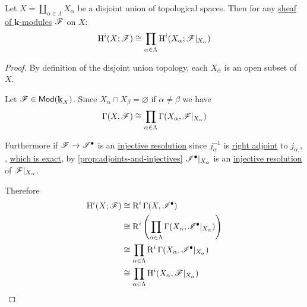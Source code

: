 \documentclass[../../main]{subfiles}
\begin{document}
\begin{theorem}[Additivity]\label{thm:additivity-axiom}
  Let \(X = \coprod_{\alpha \in \Lambda} X_{\alpha}\) be a disjoint union of topological spaces.
  Then for any \hyperref[def:sheaf]{sheaf of \(\mathbf{k}\)-modules} \(\mathscr{F}\) on \(X\):
  \begin{equation*}
    \operatorname{H}^{i}(X; \mathscr{F}) \cong \prod_{\alpha \in \Lambda} \operatorname{H}^{i}(X_{\alpha}; \mathscr{F}|_{X_{\alpha}})
  \end{equation*}
\end{theorem}
\begin{proof}
  By definition of the disjoint union topology, each \(X_{\alpha}\) is an open subset of \(X\).

  Let \(\mathscr{F} \in \mathsf{Mod} ( \underline{\mathbf{k}}_{X} )\).
  Since \(X_{\alpha} \cap X_{\beta} = \varnothing\) if \(\alpha \neq \beta\) we have
  \begin{equation*}
    \Gamma(X, \mathscr{F}) \cong \prod_{\alpha \in \Lambda} \Gamma(X_{\alpha}, \mathscr{F}|_{X_{\alpha}})
  \end{equation*}

  Furthermore if \(\mathscr{F} \to \mathscr{I}^{\bullet}\) is an \hyperref[def:resolution]{injective resolution} since \(j_{\alpha}^{-1}\) is \hyperref[def:adjoint-functors]{right adjoint} to \(j_{\alpha, !}\), \hyperref[cor:extension-by-zero-sheaf-exact]{which is exact}, by \autoref{prop:adjoints-and-injectives} \(\mathscr{I}^{\bullet}|_{X_{\alpha}}\) is an \hyperref[def:resolution]{injective resolution} of \(\mathscr{F}|_{X_{\alpha}}\).
  
  Therefore
  \begin{align*}
    \operatorname{H}^{i}(X; \mathscr{F}) &\cong \operatorname{R}^{i}\Gamma(X, \mathscr{I}^{\bullet}) \\
                                 &\cong  \operatorname{R}^{i} \left( \prod_{\alpha \in \Lambda} \Gamma(X_{\alpha}, \mathscr{I}^{\bullet}|_{X_{\alpha}}) \right) \\
                                 &\cong \prod_{\alpha \in \Lambda} \operatorname{R}^{i} \Gamma(X_{\alpha}, \mathscr{I}^{\bullet}|_{X_{\alpha}}) \\
                                 &\cong \prod_{\alpha \in \Lambda} \operatorname{H}^{i}(X_{\alpha}, \mathscr{F}|_{X_{\alpha}}) \qedhere
  \end{align*}
\end{proof}
\end{document}
